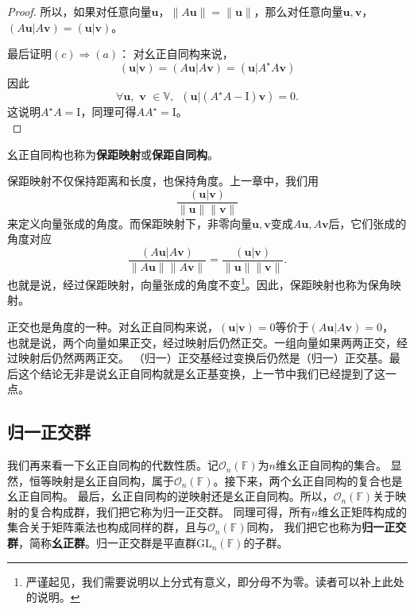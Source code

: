 \documentclass[12pt,UTF8,fontset=none]{ctexbook}
\begin{document}
\begin{proof}
所以，如果对任意向量$\mathbf{u}$，$\|A\mathbf{u}\| = \|\mathbf{u}\|$，那么对任意向量$\mathbf{u}, \mathbf{v}$，$(A\mathbf{u}|A\mathbf{v}) = (\mathbf{u}|\mathbf{v})$。

最后证明$(c) \Rightarrow (a)$：
对幺正自同构来说，
$$(\mathbf{u} | \mathbf{v}) = (A\mathbf{u} | A\mathbf{v}) = (\mathbf{u} | A^\star A\mathbf{v})$$
因此
$$  \forall \mathbf{u}, \,\, \mathbf{v} \,\, \in \mathbb{V},\,\,\, (\mathbf{u} | (A^\star A - \mathrm{I})\mathbf{v}) = 0.$$
这说明$A^\star A = \mathrm{I}$，同理可得$ A A^\star = \mathrm{I}$。\\
\end{proof}


幺正自同构也称为\textbf{保距映射}或\textbf{保距自同构}。

保距映射不仅保持距离和长度，也保持角度。上一章中，我们用
$$\frac{(\mathbf{u}|\mathbf{v})}{\|\mathbf{u}\|\|\mathbf{v}\|}$$
来定义向量张成的角度。而保距映射下，非零向量$\mathbf{u}, \mathbf{v}$变成$A\mathbf{u}, A\mathbf{v}$后，它们张成的角度对应
$$\frac{(A\mathbf{u}|A\mathbf{v})}{\|A\mathbf{u}\|\|A\mathbf{v}\|} = \frac{(\mathbf{u}|\mathbf{v})}{\|\mathbf{u}\|\|\mathbf{v}\|}.$$
也就是说，经过保距映射，向量张成的角度不变\footnote{严谨起见，我们需要说明以上分式有意义，即分母不为零。读者可以补上此处的说明。}。因此，保距映射也称为保角映射。

正交也是角度的一种。对幺正自同构来说，$(\mathbf{u}|\mathbf{v}) = 0$等价于$(A\mathbf{u}|A\mathbf{v}) = 0$，
也就是说，两个向量如果正交，经过映射后仍然正交。一组向量如果两两正交，经过映射后仍然两两正交。
（归一）正交基经过变换后仍然是（归一）正交基。最后这个结论无非是说幺正自同构就是幺正基变换，上一节中我们已经提到了这一点。

\subsection{归一正交群}
我们再来看一下幺正自同构的代数性质。记$\mathcal{O}_n(\mathbb{F})$为$n$维幺正自同构的集合。
显然，恒等映射是幺正自同构，属于$\mathcal{O}_n(\mathbb{F})$。接下来，两个幺正自同构的复合也是幺正自同构。
最后，幺正自同构的逆映射还是幺正自同构。所以，$\mathcal{O}_n(\mathbb{F})$关于映射的复合构成群，我们把它称为归一正交群。
同理可得，所有$n$维幺正矩阵构成的集合关于矩阵乘法也构成同样的群，且与$\mathcal{O}_n(\mathbb{F})$同构，
我们把它也称为\textbf{归一正交群}，简称\textbf{幺正群}。归一正交群是平直群$\mathrm{GL}_n(\mathbb{F})$的子群。
\end{document}
